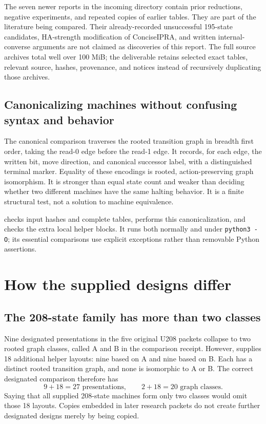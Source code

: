 \documentclass[11pt,a4paper]{article}
\begin{document}
The seven newer reports in the incoming directory contain prior reductions,
negative experiments, and repeated copies of earlier tables. They are part
of the literature being compared. Their already-recorded unsuccessful
195-state candidates, HA-strength modification of ConciseIPRA, and written
internal-converse arguments are not claimed as discoveries of this report.
The full source archives total well over 100 MiB; the deliverable retains
selected exact tables, relevant source, hashes, provenance, and notices
instead of recursively duplicating those archives.

\subsection{Canonicalizing machines without confusing syntax and behavior}
The canonical comparison traverses the rooted transition graph in breadth
first order, taking the read-0 edge before the read-1 edge. It records, for
each edge, the written bit, move direction, and canonical successor label,
with a distinguished terminal marker. Equality of these encodings is rooted,
action-preserving graph isomorphism. It is stronger than equal state count
and weaker than deciding whether two different machines have the same
halting behavior. It is a finite structural test, not a solution to machine
equivalence.

 checks input hashes and complete tables,
performs this canonicalization, and checks the extra local helper blocks.
It runs both normally and under \texttt{python3 -O}; its essential comparisons
use explicit exceptions rather than removable Python assertions.

\section{How the supplied designs differ}
\subsection{The 208-state family has more than two classes}
Nine designated presentations in the five original U208 packets collapse
to two rooted graph classes, called A and B in the comparison receipt.
However,  supplies 18 additional helper
layouts: nine based on A and nine based on B. Each has a distinct rooted
transition graph, and none is isomorphic to A or B. The correct designated
comparison therefore has
\[
       9+18=27\text{ presentations},\qquad 2+18=20\text{ graph classes}.
\]
Saying that all supplied 208-state machines form only two classes would
omit those 18 layouts. Copies embedded in later research packets do not
create further designated designs merely by being copied.
\end{document}
